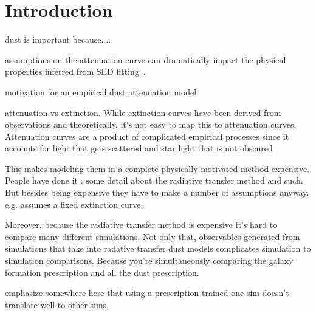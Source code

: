 \section{Introduction} \label{sec:intro} 


dust is important because....


assumptions on the attenuation curve can dramatically impact the physical
properties inferred from SED fitting~\citep[\eg][]{kriek2013, shivaei2015,
reddy2015, salim2020}. 


motivation for an empirical dust attenuation model

attenuation vs extinction. While extinction curves have been derived from
observations and theoretically, it's not easy to map this to attenuation
curves. Attenuation curves are a product of complicated empirical processes
since it accounts for light that gets scattered and star light that is not
obscured 

This makes modeling them in a complete physically motivated method expensive.
People have done it \cite{narayanan2018, trayford2020}. 
some detail about the
radiative transfer method and such. But besides being expensive they have to
make a number of assumptions anyway. e.g. \cite{narayanan2018} assumes a fixed
extinction curve. 

Moreover, because the radiative transfer method is expensive it's hard to
compare many different simulations. Not only that, observables generated from
simulations that take into radative transfer dust models complicates simulation
to simulation comparisons. Because you're simultaneously comparing the galaxy
formation prescription and all the dust prescription. 

emphasize somewhere here that using a prescription trained one sim doesn't
translate well to other sims. 

